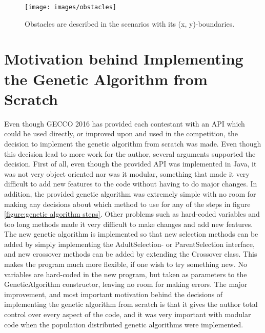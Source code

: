 \begin{figure}[h!]
\begin{center}
\texttt{[image: images/obstacles]}
\caption{Obstacles are described in the scenarios with its (x, y)-boundaries.}
\label{figure:obstacles}
\end{center}
\end{figure}


\section{Motivation behind Implementing the Genetic Algorithm from Scratch}\label{section:motivation}
Even though GECCO	 2016 has provided each contestant with an API which could be used directly, or improved upon and used in the competition, the decision to implement the genetic algorithm from scratch was made. Even though this decision lead to more work for the author, several arguments supported the decision. First of all, even though the provided API was implemented in Java, it was not very object oriented nor was it modular, something that made it very difficult to add new features to the code without having to do major changes. In addition, the provided genetic algorithm was extremely simple with no room for making any decisions about which method to use for any of the steps in figure \ref{figure:genetic algorithm steps}. Other problems such as hard-coded variables and too long methods made it very difficult to make changes and add new features. \\

\noindent The new genetic algorithm is implemented so that new selection methods can be added by simply implementing the AdultSelection- or ParentSelection interface, and new crossover methods can be added by extending the Crossover class. This makes the program much more flexible, if one wish to try something new. No variables are hard-coded in the new program, but taken as parameters to the GeneticAlgorithm constructor, leaving no room for making errors. The major improvement, and most important motivation behind the decisions of implementing the genetic algorithm from scratch is that it gives the author total control over every aspect of the code, and it was very important with modular code when the population distributed genetic algorithms were implemented.